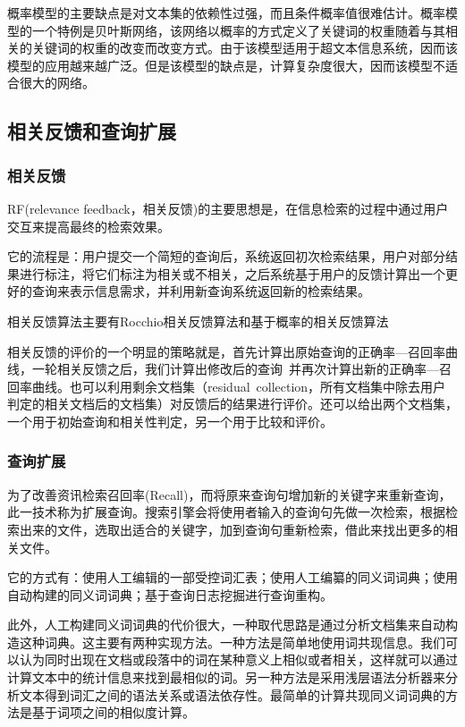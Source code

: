 \documentclass[a4paper]{article}
\begin{document}
概率模型的主要缺点是对文本集的依赖性过强，而且条件概率值很难估计。概率模型的一个特例是贝叶斯网络，该网络以概率的方式定义了关键词的权重随着与其相关的关键词的权重的改变而改变方式。由于该模型适用于超文本信息系统，因而该模型的应用越来越广泛。但是该模型的缺点是，计算复杂度很大，因而该模型不适合很大的网络。

\subsection{相关反馈和查询扩展}
\subsubsection{相关反馈}
RF(relevance feedback，相关反馈)的主要思想是，在信息检索的过程中通过用户交互来提高最终的检索效果。

它的流程是：用户提交一个简短的查询后，系统返回初次检索结果，用户对部分结果进行标注，将它们标注为相关或不相关，之后系统基于用户的反馈计算出一个更好的查询来表示信息需求，并利用新查询系统返回新的检索结果。

相关反馈算法主要有Rocchio相关反馈算法和基于概率的相关反馈算法

相关反馈的评价的一个明显的策略就是，首先计算出原始查询的正确率—召回率曲线，一轮相关反馈之后，我们计算出修改后的查询 并再次计算出新的正确率—召回率曲线。也可以利用剩余文档集（residual collection，所有文档集中除去用户判定的相关文档后的文档集）对反馈后的结果进行评价。还可以给出两个文档集，一个用于初始查询和相关性判定，另一个用于比较和评价。

\subsubsection{查询扩展}
为了改善资讯检索召回率(Recall)，而将原来查询句增加新的关键字来重新查询，此一技术称为扩展查询。搜索引擎会将使用者输入的查询句先做一次检索，根据检索出来的文件，选取出适合的关键字，加到查询句重新检索，借此来找出更多的相关文件。

它的方式有：使用人工编辑的一部受控词汇表；使用人工编纂的同义词词典；使用自动构建的同义词词典；基于查询日志挖掘进行查询重构。

此外，人工构建同义词词典的代价很大，一种取代思路是通过分析文档集来自动构造这种词典。这主要有两种实现方法。一种方法是简单地使用词共现信息。我们可以认为同时出现在文档或段落中的词在某种意义上相似或者相关，这样就可以通过计算文本中的统计信息来找到最相似的词。另一种方法是采用浅层语法分析器来分析文本得到词汇之间的语法关系或语法依存性。最简单的计算共现同义词词典的方法是基于词项之间的相似度计算。
\end{document}
